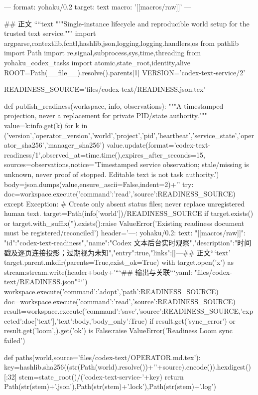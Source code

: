 ---
format: yohaku/0.2
target: text
macro: '[[macros/raw]]'
---

## 正文
````text
"""Single-instance lifecycle and reproducible world setup for the trusted text service."""
import argparse,contextlib,fcntl,hashlib,json,logging,logging.handlers,os
from pathlib import Path
import re,signal,subprocess,sys,time,threading
from yohaku_codex_tasks import atomic,state_root,identity,alive
ROOT=Path(__file__).resolve().parents[1]
VERSION='codex-text-service/2'

READINESS_SOURCE='files/codex-text/READINESS.json.tex'

def publish_readiness(workspace, info, observations):
    """A timestamped projection, never a replacement for private PID/state authority."""
    value={k:info.get(k) for k in ('version','operator_version','world','project','pid','heartbeat','service_state','operator_sha256','manager_sha256')}
    value.update(format='codex-text-readiness/1',observed_at=time.time(),expires_after_seconds=15,
                 sources=observations,notice='Timestamped service observation; stale/missing is unknown, never proof of stopped. Editable text is not task authority.')
    body=json.dumps(value,ensure_ascii=False,indent=2)+'\n'
    try:
        doc=workspace.execute({'command':'read','source':READINESS_SOURCE})
    except Exception:
        # Create only absent status files; never replace unregistered human text.
        target=Path(info['world'])/READINESS_SOURCE
        if target.exists() or target.with_suffix('').exists():raise ValueError('Existing readiness document must be registered/reconciled')
        header='---\nformat: yohaku/0.2\ntarget: text\nmacro: "[[macros/raw]]"\nnode: {"id":"codex-text-readiness","name":"Codex 文本后台实时观察","description":"时间戳及逐页连接投影；过期视为未知","entry":true,"links":[]}\n---\n\n## 正文\n```text\n'
        target.parent.mkdir(parents=True,exist_ok=True)
        with target.open('x') as stream:stream.write(header+body+'```\n\n## 输出与关联\n```yaml\noutput: "files/codex-text/READINESS.json"\n```\n')
        workspace.execute({'command':'adopt','path':READINESS_SOURCE})
        doc=workspace.execute({'command':'read','source':READINESS_SOURCE})
    result=workspace.execute({'command':'save','source':READINESS_SOURCE,'expected':doc['text'],'text':body,'body_only':True})
    if result.get('sync_error') or result.get('loom',{}).get('ok') is False:raise ValueError('Readiness Loom sync failed')


def paths(world,source='files/codex-text/OPERATOR.md.tex'):
    key=hashlib.sha256((str(Path(world).resolve())+'\n'+source).encode()).hexdigest()[:32]
    stem=state_root()/('codex-text-service-'+key)
    return Path(str(stem)+'.json'),Path(str(stem)+'.lock'),Path(str(stem)+'.log')

